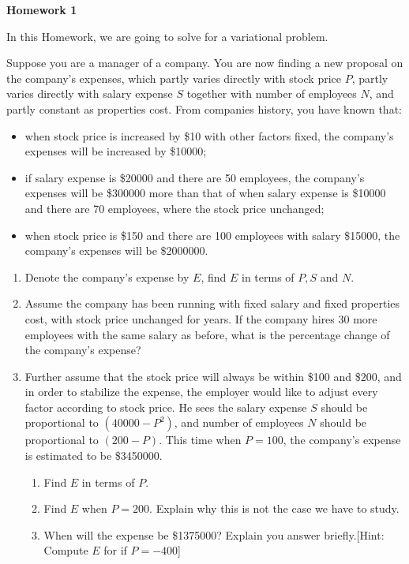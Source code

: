 \documentclass[12pt]{article}
\begin{document}
    \begin{center}
        \textbf{Homework 1}
    \end{center}

    In this Homework, we are going to solve for a variational problem.

    Suppose you are a manager of a company. You are now finding a new proposal on the company's expenses, which partly varies directly with stock price $P$, partly varies directly with salary expense $S$ together with number of employees $N$, and partly constant as properties cost. From companies history, you have known that:\begin{itemize}
        \item when stock price is increased by \$10 with other factors fixed, the company's expenses will be increased by \$10000;
        \item if salary expense is \$20000 and there are 50 employees, the company's expenses will be \$300000 more than that of when salary expense is \$10000 and there are 70 employees, where the stock price unchanged;
        \item when stock price is \$150 and there are 100 employees with salary \$15000, the company's expenses will be \$2000000.
    \end{itemize}

    \begin{enumerate}
        \item Denote the company's expense by $E$, find $E$ in terms of $P,S$ and $N$.
        \item Assume the company has been running with fixed salary and fixed properties cost, with stock price unchanged for years. If the company hires 30 more employees with the same salary as before, what is the percentage change of the company's expense?
        \item Further assume that the stock price will always be within \$100 and \$200, and in order to stabilize the expense, the employer would like to adjust every factor according to stock price. He sees the salary expense $S$ should be proportional to $(40000-P^2)$, and number of employees $N$ should be proportional to $(200-P)$. This time when $P=100$, the company's expense is estimated to be \$3450000.\begin{enumerate}
            \item Find $E$ in terms of $P$.
            \item Find $E$ when $P=200$. Explain why this is not the case we have to study.
            \item When will the expense be \$1375000? Explain you answer briefly.[Hint: Compute $E$ for if $P=-400$]
        \end{enumerate}
    \end{enumerate}
\end{document}
